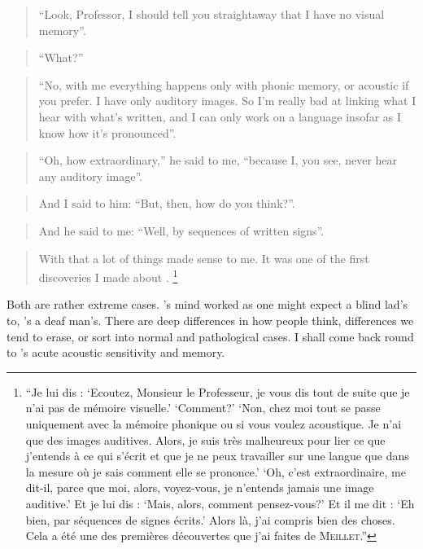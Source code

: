 \documentclass[output=paper]{langscibook}
\begin{document}
\begin{quotation}
``Look, Professor, I should tell you straightaway that I have no visual memory''.
\end{quotation}

\begin{quotation}
``What?''
\end{quotation}

\begin{quotation}
``No, with me everything happens only with phonic memory, or acoustic if you prefer. I have only auditory images. So I'm really bad at linking what I hear with what’s written, and I can only work on a language insofar as I know how it’s pronounced''.
\end{quotation}

\begin{quotation}
``Oh, how extraordinary,'' he said to me, ``because I, you see, never hear any auditory image''.
\end{quotation}

\begin{quotation}
And I said to him: ``But, then, how do you think?''.
\end{quotation}

\begin{quotation}
And he said to me: ``Well, by sequences of written signs''.
\end{quotation}

\begin{quotation}
With that a lot of things made sense to me. It was one of the first discoveries I made about {\Meillet}. \citep[193]{Sauvageot1992}\footnote{``Je lui dis : `Ecoutez, Monsieur le Professeur, je vous dis tout de suite que je n'ai pas de mémoire visuelle.' `Comment?' `Non, chez moi tout se passe uniquement avec la mémoire phonique ou si vous voulez acoustique. Je n'ai que des images auditives. Alors, je suis très malheureux pour lier ce que j'entends à ce qui s'écrit et que je ne peux travailler sur une langue que dans la mesure où je sais comment elle se prononce.' `Oh, c'est extraordinaire, me dit-il, parce que moi, alors, voyez-vous, je n'entends jamais une image auditive.' Et je lui dis : `Mais, alors, comment pensez-vous?' Et il me dit : `Eh bien, par séquences de signes écrits.' Alors là, j'ai compris bien des choses. Cela a été une des premières découvertes que j'ai faites de \textsc{Meillet}.''}
\end{quotation}

Both are rather extreme cases. {\Sauvageot}'s mind worked as one might expect a blind lad's to, {\Meillet}'s a deaf man's. There are deep differences in how people think, differences we tend to erase, or sort into normal and pathological cases. I shall come back round to {\Sauvageot}’s acute acoustic sensitivity and memory.
\end{document}
